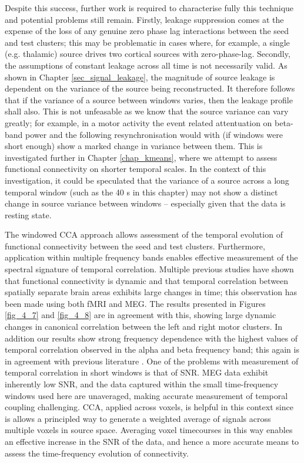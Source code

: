 Despite this success, further work is required to characterise fully this technique and potential problems still remain.  Firstly, leakage suppression comes at the expense of the loss of any genuine zero phase lag interactions between the seed and test clusters; this may be problematic in cases where, for example, a single (e.g. thalamic) source drives two cortical sources with zero-phase-lag. Secondly, the assumptions of constant leakage across all time is not necessarily valid. As shown in Chapter \ref{sec_signal_leakage}, the magnitude of source leakage is dependent on the variance of the source being reconstructed. It therefore follows that if the variance of a source between windows varies, then the leakage profile shall also. This is not unfeasable as we know that the source variance can vary greatly; for example, in a motor activity the event related attentuation on beta-band power and the following resynchronisation would with (if windows were short enough) show a marked change in variance between them. This is investigated further in Chapter \ref{chap_kmeans}, where we attempt to assess functional connectivity on shorter temporal scales. In the context of this investigation, it could be speculated that the variance of a source across a long temporal window (such as the 40 s in this chapter) may not show a distinct change in source variance between windows -- especially given that the data is resting state.

The windowed CCA approach allows assessment of the temporal evolution of functional connectivity between the seed and test clusters. Furthermore, application within multiple frequency bands enables effective measurement of the spectral signature of temporal correlation. Multiple previous studies \citep{Chang2010,dePasquale2010,Brookes2011a,Baker2012,dePasquale2012} have shown that functional connectivity is dynamic and that temporal correlation between spatially separate brain areas exhibits large changes in time; this observation has been made using both fMRI and MEG. The results presented in Figures \ref{fig_4_7} and \ref{fig_4_8} are in agreement with this, showing large dynamic changes in canonical correlation between the left and right motor clusters. In addition our results show strong frequency dependence with the highest values of temporal correlation observed in the alpha and beta frequency band; this again is in agreement with previous literature \citep{Mantini2007,Brookes2011a,Hipp2012}. One of the problems with measurement of temporal correlation in short windows is that of SNR. MEG data exhibit inherently low SNR, and the data captured within the small time-frequency windows used here are unaveraged, making accurate measurement of temporal coupling challenging. CCA, applied across voxels, is helpful in this context since is allows a principled way to generate a weighted average of signals across multiple voxels in source space. Averaging voxel timecourses in this way enables an effective increase in the SNR of the data, and hence a more accurate means to assess the time-frequency evolution of connectivity. 

